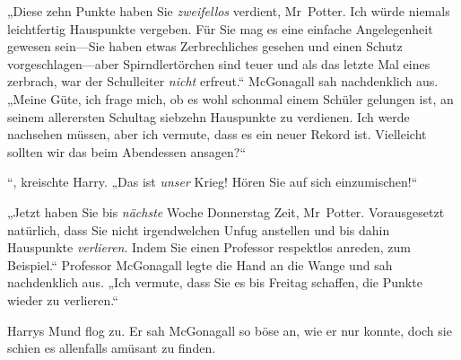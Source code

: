 „Diese zehn Punkte haben Sie \emph{zweifellos} verdient, Mr~Potter. Ich würde niemals leichtfertig Hauspunkte vergeben. Für Sie mag es eine einfache Angelegenheit gewesen sein—Sie haben etwas Zerbrechliches gesehen und einen Schutz vorgeschlagen—aber Spirndlertörchen sind teuer und als das letzte Mal eines zerbrach, war der Schulleiter \emph{nicht} erfreut.“ McGonagall sah nachdenklich aus. „Meine Güte, ich frage mich, ob es wohl schonmal einem Schüler gelungen ist, an seinem allerersten Schultag siebzehn Hauspunkte zu verdienen. Ich werde nachsehen müssen, aber ich vermute, dass es ein neuer Rekord ist. Vielleicht sollten wir das beim Abendessen ansagen?“

“, kreischte Harry. „Das ist \emph{unser} Krieg! Hören Sie auf sich einzumischen!“

„Jetzt haben Sie bis \emph{nächste} Woche Donnerstag Zeit, Mr~Potter. Vorausgesetzt natürlich, dass Sie nicht irgendwelchen Unfug anstellen und bis dahin Hauspunkte \emph{verlieren}. Indem Sie einen Professor respektlos anreden, zum Beispiel.“ Professor McGonagall legte die Hand an die Wange und sah nachdenklich aus. „Ich vermute, dass Sie es bis Freitag schaffen, die Punkte wieder zu verlieren.“

Harrys Mund flog zu. Er sah McGonagall so böse an, wie er nur konnte, doch sie schien es allenfalls amüsant zu finden.

